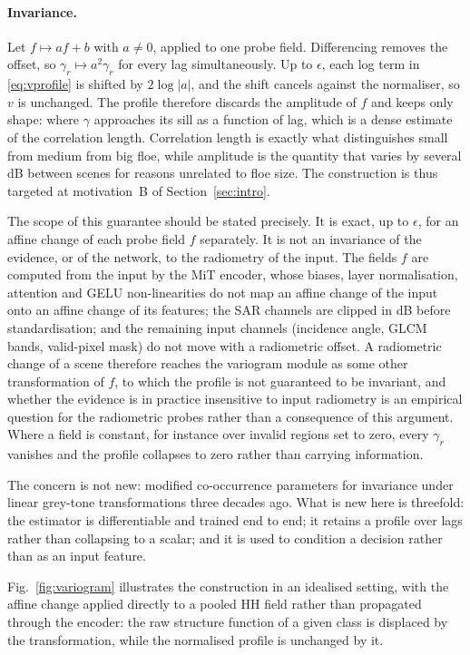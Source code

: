 \documentclass[preprint,12pt,authoryear]{elsarticle}
\begin{document}
\paragraph{Invariance.} Let $f \mapsto af + b$ with $a \neq 0$, applied to one
probe field. Differencing
removes the offset, so $\gamma_r \mapsto a^2\gamma_r$ for every lag
simultaneously. Up to $\epsilon$, each log term in \eqref{eq:vprofile} is
shifted by $2\log|a|$, and the shift cancels against the normaliser, so
$v$ is unchanged. The profile therefore discards the amplitude of $f$ and keeps
only shape: where $\gamma$ approaches its sill as a function of lag, which is
a dense estimate of the correlation length. Correlation length is exactly what
distinguishes small from medium from big floe, while amplitude is the quantity
that varies by several dB between scenes for reasons unrelated to floe size. The
construction is thus targeted at motivation~B of Section~\ref{sec:intro}.

The scope of this guarantee should be stated precisely. It is exact, up to
$\epsilon$, for an affine change of each probe field $f$ separately. It is not
an invariance of the evidence, or of the network, to the radiometry of the
input. The fields $f$ are computed from the input by the MiT encoder, whose
biases, layer normalisation, attention and GELU non-linearities do not map an
affine change of the input onto an affine change of its features; the SAR
channels are clipped in dB before standardisation; and the remaining input
channels (incidence angle, GLCM bands, valid-pixel mask) do not move with a
radiometric offset. A radiometric change of a scene therefore reaches the
variogram module as some other transformation of $f$, to which the profile is
not guaranteed to be invariant, and whether the evidence is in practice
insensitive to input radiometry is an empirical question for the radiometric
probes rather than a consequence of this argument. Where a field is constant,
for instance over invalid regions set to zero, every $\gamma_r$ vanishes and the
profile collapses to zero rather than carrying information.

The concern is not new: \citet{shokr1991evaluation} modified co-occurrence
parameters for invariance under linear grey-tone transformations three decades
ago. What is new here is threefold: the estimator is differentiable and trained
end to end; it retains a profile over lags rather than collapsing to a scalar;
and it is used to condition a decision rather than as an input feature.

Fig.~\ref{fig:variogram} illustrates the construction in an idealised setting,
with the affine change applied directly to a pooled HH field rather than
propagated through the encoder: the raw structure function of a given class is
displaced by the transformation, while the normalised profile is unchanged by
it.
\end{document}
